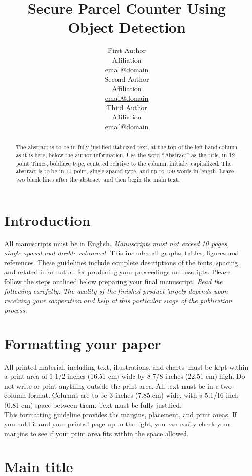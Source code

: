 \documentclass[10pt,sigconf, review]{article}
\title{ \huge Secure Parcel Counter Using Object Detection}
\author{First Author \\
  Affiliation \\
  {\underline{ email@domain}} \\\And
  Second Author \\
  Affiliation \\
  {\underline{ email@domain} }\\\And 
  Third Author \\
  Affiliation \\
  {\underline{email@domain}} \\}
\date{}
\begin{document}
\maketitle
\begin{abstract}
The abstract is to be in fully-justified italicized text, at the top of the
left-hand column as it is here, below the author information. Use the word
“Abstract” as the title, in 12-point Times, boldface type, centered relative to
the column, initially capitalized. The abstract is to be in 10-point,
single-spaced type, and up to 150 words in length. Leave two blank lines after
the abstract, and then begin the main text. 

\end{abstract}

\section{Introduction}

All manuscripts must be in English. {\em Manuscripts must not exceed 10 pages,
single-spaced and double-columned}.  This includes all graphs, tables, figures
and references. These guidelines include complete descriptions of the fonts,
spacing, and related information for producing your proceedings manuscripts.
Please follow the steps outlined below preparing your final manuscript. {\em
Read the following carefully. The quality of the finished product largely
depends upon receiving your cooperation and help at this particular stage of
the publication process.}


\section{Formatting your paper}

All printed material, including text, illustrations, and charts, must be kept
within a print area of 6-1/2 inches (16.51 cm) wide by 8-7/8 inches (22.51 cm)
high. Do not write or print anything outside the print area. All text must be
in a two-column format. Columns are to be 3 inches (7.85 cm) wide, with a
5.1/16 inch (0.81 cm) space between them. Text must be fully justified. \\ This
formatting guideline provides the margins, placement, and print areas. If you
hold it and your printed page up to the light, you can easily check your
margins to see if your print area fits within the space allowed.


\section{Main title}
\end{document}
